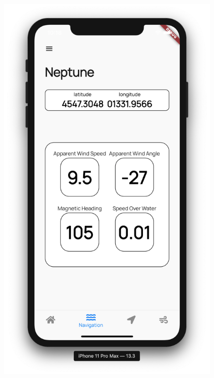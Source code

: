 \documentclass[12pt,italian,oneside]{report}
\newcounter{cap}
\begin{document}
\begin{firstheadlineitemize}
\begin{figure}[htp]
\begin{minipage}[b]{.5\columnwidth}
	\includegraphics[scale=0.31]{navigation_high_contrast}
\end{minipage}\hspace*{\fill}
\end{figure}

\end{firstheadlineitemize}

\end{document}
